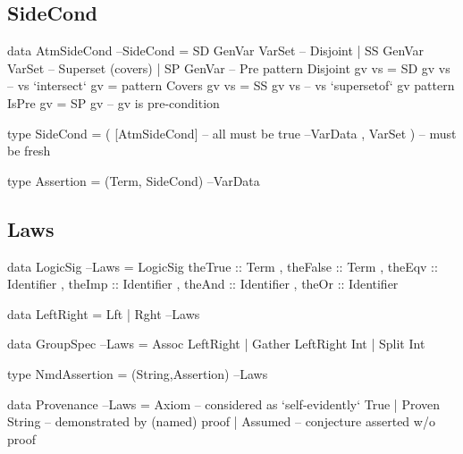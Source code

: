 \subsection{SideCond}

\begin{code}
data AtmSideCond                                                    --SideCond
 = SD  GenVar VarSet -- Disjoint
 | SS  GenVar VarSet -- Superset (covers)
 | SP  GenVar        -- Pre
pattern Disjoint gv vs = SD  gv vs  --  vs `intersect`  gv = {}
pattern Covers   gv vs = SS  gv vs  --  vs `supersetof` gv
pattern IsPre    gv    = SP  gv     --  gv is pre-condition
\end{code}

\begin{code}
type SideCond = ( [AtmSideCond]  -- all must be true                 --VarData
                , VarSet )       -- must be fresh
\end{code}

\begin{code}
type Assertion = (Term, SideCond)                                    --VarData
\end{code}

\subsection{Laws}

\begin{code}
data LogicSig                                                           --Laws
  = LogicSig
     { theTrue  :: Term
     , theFalse :: Term
     , theEqv   :: Identifier
     , theImp   :: Identifier
     , theAnd   :: Identifier
     , theOr    :: Identifier
     }
\end{code}

\begin{code}
data LeftRight = Lft | Rght                                             --Laws

data GroupSpec                                                          --Laws
  = Assoc LeftRight
  | Gather LeftRight Int
  | Split Int
\end{code}

\begin{code}
type NmdAssertion = (String,Assertion)                                  --Laws
\end{code}

\begin{code}
data Provenance                                                         --Laws
  = Axiom          --  considered as `self-evidently` True
  | Proven String  --  demonstrated by (named) proof
  | Assumed        --  conjecture asserted w/o proof
\end{code}

